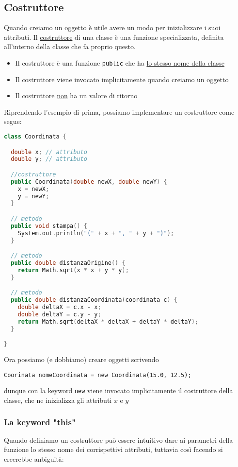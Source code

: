 \subsection{Costruttore}
Quando creiamo un oggetto è utile avere un modo per inizializzare i suoi attributi. Il \underline{costruttore} di una classe è una funzione specializzata, definita all'interno della classe che fa proprio questo.
\begin{itemize}
	\item Il costruttore è una funzione \verb|public| che ha \underline{lo stesso nome della classe}
	\item Il costruttore viene invocato implicitamente quando creiamo un oggetto
	\item Il costruttore \underline{non} ha un valore di ritorno
\end{itemize}
Riprendendo l'esempio di prima, possiamo implementare un costruttore come segue:
\vskip3mm
\begin{lstlisting}[language = c++, frame = none]
class Coordinata {

  double x; // attributo
  double y; // attributo

  //costruttore
  public Coordinata(double newX, double newY) {
    x = newX;
    y = newY;
  }

  // metodo
  public void stampa() {
    System.out.println("(" + x + ", " + y + ")");
  }

  // metodo
  public double distanzaOrigine() {
    return Math.sqrt(x * x + y * y);
  }

  // metodo
  public double distanzaCoordinata(coordinata c) {
    double deltaX = c.x - x;
    double deltaY = c.y - y;
    return Math.sqrt(deltaX * deltaX + deltaY * deltaY);
  }

}
\end{lstlisting}

Ora possiamo (e dobbiamo) creare oggetti scrivendo
\begin{center}
	\verb|Coorinata nomeCoordinata = new Coordinata(15.0, 12.5);|
\end{center}
dunque con la keyword \verb|new| viene invocato implicitamente il costruttore della classe, che ne inizializza gli attributi $ x $ e $ y $

\subsubsection{La keyword "this"}
Quando definiamo un costruttore può essere intuitivo dare ai parametri della funzione lo stesso nome dei corrispettivi attributi, tuttavia così facendo si creerebbe anbiguità:

